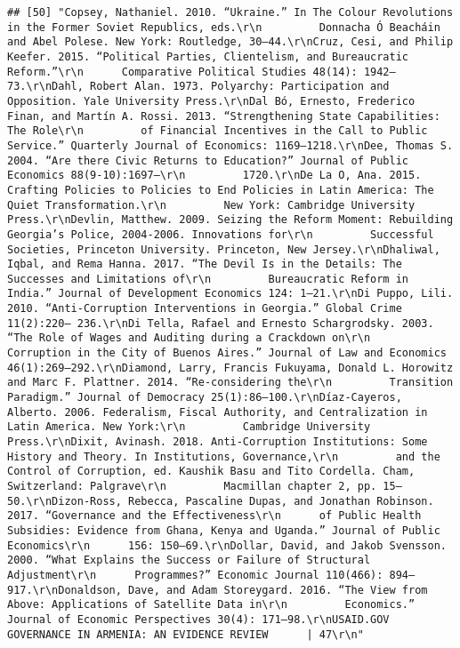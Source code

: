 \documentclass[
]{article}
\begin{document}
\begin{verbatim}
## [50] "Copsey, Nathaniel. 2010. “Ukraine.” In The Colour Revolutions in the Former Soviet Republics, eds.\r\n         Donnacha Ó Beacháin and Abel Polese. New York: Routledge, 30–44.\r\nCruz, Cesi, and Philip Keefer. 2015. “Political Parties, Clientelism, and Bureaucratic Reform.”\r\n      Comparative Political Studies 48(14): 1942–73.\r\nDahl, Robert Alan. 1973. Polyarchy: Participation and Opposition. Yale University Press.\r\nDal Bó, Ernesto, Frederico Finan, and Martín A. Rossi. 2013. “Strengthening State Capabilities: The Role\r\n         of Financial Incentives in the Call to Public Service.” Quarterly Journal of Economics: 1169–1218.\r\nDee, Thomas S. 2004. “Are there Civic Returns to Education?” Journal of Public Economics 88(9-10):1697–\r\n         1720.\r\nDe La O, Ana. 2015. Crafting Policies to Policies to End Policies in Latin America: The Quiet Transformation.\r\n         New York: Cambridge University Press.\r\nDevlin, Matthew. 2009. Seizing the Reform Moment: Rebuilding Georgia’s Police, 2004-2006. Innovations for\r\n         Successful Societies, Princeton University. Princeton, New Jersey.\r\nDhaliwal, Iqbal, and Rema Hanna. 2017. “The Devil Is in the Details: The Successes and Limitations of\r\n         Bureaucratic Reform in India.” Journal of Development Economics 124: 1–21.\r\nDi Puppo, Lili. 2010. “Anti-Corruption Interventions in Georgia.” Global Crime 11(2):220– 236.\r\nDi Tella, Rafael and Ernesto Schargrodsky. 2003. “The Role of Wages and Auditing during a Crackdown on\r\n         Corruption in the City of Buenos Aires.” Journal of Law and Economics 46(1):269–292.\r\nDiamond, Larry, Francis Fukuyama, Donald L. Horowitz and Marc F. Plattner. 2014. “Re-considering the\r\n         Transition Paradigm.” Journal of Democracy 25(1):86–100.\r\nDíaz-Cayeros, Alberto. 2006. Federalism, Fiscal Authority, and Centralization in Latin America. New York:\r\n         Cambridge University Press.\r\nDixit, Avinash. 2018. Anti-Corruption Institutions: Some History and Theory. In Institutions, Governance,\r\n         and the Control of Corruption, ed. Kaushik Basu and Tito Cordella. Cham, Switzerland: Palgrave\r\n         Macmillan chapter 2, pp. 15–50.\r\nDizon-Ross, Rebecca, Pascaline Dupas, and Jonathan Robinson. 2017. “Governance and the Effectiveness\r\n      of Public Health Subsidies: Evidence from Ghana, Kenya and Uganda.” Journal of Public Economics\r\n      156: 150–69.\r\nDollar, David, and Jakob Svensson. 2000. “What Explains the Success or Failure of Structural Adjustment\r\n      Programmes?” Economic Journal 110(466): 894–917.\r\nDonaldson, Dave, and Adam Storeygard. 2016. “The View from Above: Applications of Satellite Data in\r\n         Economics.” Journal of Economic Perspectives 30(4): 171–98.\r\nUSAID.GOV                                                    GOVERNANCE IN ARMENIA: AN EVIDENCE REVIEW      | 47\r\n"                                                                                                                                                                                                                                                                                                                                                                                                                                          
\end{verbatim}
\end{document}

